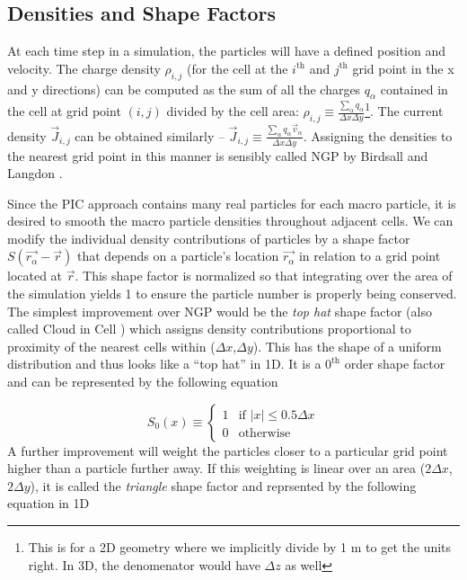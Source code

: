 \subsection{Densities and Shape Factors}

At each time step in a simulation, the particles will have a defined position and velocity. The charge density $\rho_{i,j}$ (for the cell at the $i^\text{th}$ and $j^\text{th}$ grid point in the x and y directions) can be computed as the sum of all the charges $q_\alpha$ contained in the cell at grid point $(i,j)$ divided by the cell area: $\rho_{i,j} \equiv \frac{\sum_\alpha q_\alpha}{\Delta x \Delta y}$\footnote{This is for a 2D geometry where we implicitly divide by 1 m to get the units right. In 3D, the denomenator would have $\Delta z$ as well}. The current density $\vec{J}_{i,j}$ can be obtained similarly -- $\vec{J}_{i,j} \equiv \frac{\sum_\alpha q_\alpha \vec{v}_\alpha}{\Delta x \Delta y}$. Assigning the densities to the nearest grid point in this manner is sensibly called \gls{NGP} by Birdsall and Langdon \cite{Birdsall_2004_PIC}.

Since the PIC approach contains many real particles for each macro particle, it is desired to smooth the macro particle densities throughout adjacent cells. We can modify the individual density contributions of particles by a shape factor $S(\vec{r_\alpha} - \vec{r})$ that depends on a particle's location $\vec{r_\alpha}$ in relation to a grid point located at $\vec{r}$. This shape factor is normalized so that integrating over the area of the simulation yields 1 to ensure the particle number is properly being conserved. The simplest improvement over \gls{NGP} would be the \emph{top hat} shape factor (also called Cloud in Cell \cite{Birdsall_2004_PIC}) which assigns density contributions proportional to proximity of the nearest cells within ($\Delta x$,$\Delta y$). This has the shape of a uniform distribution and thus looks like a ``top hat'' in 1D. It is a $0^\text{th}$ order shape factor and can be represented by the following equation

\begin{equation}
	S_0(x) \equiv \begin{cases}
		1 & \text{if } \lvert x \rvert \leq 0.5 \Delta x \\
		0 & \text{otherwise}
	\end{cases} \label{eq:tophat}
\end{equation}
A further improvement will weight the particles closer to a particular grid point higher than a particle further away. If this weighting is linear over an area ($2 \Delta x$, $2 \Delta y$), it is called the \emph{triangle} shape factor and reprsented by the following equation in 1D

